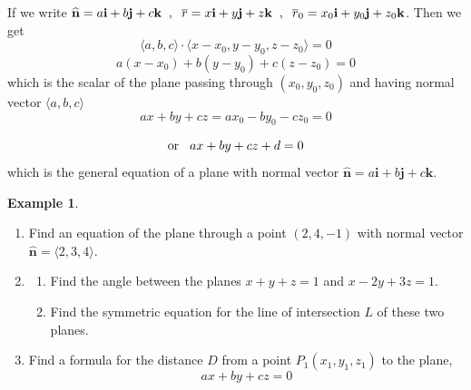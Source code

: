 \documentclass[11pt,a4paper]{article}
\theoremstyle{definition}
\newtheorem{exa}[thm]{Example}
\begin{document}
If we write $\widehat{\textbf{n}} = a\textbf{i} + b \textbf{j} + c\textbf{k}\hspace{0.2cm}, \hspace{0.2cm} \overline{r} = x\textbf{i} + y \textbf{j} + z\textbf{k} \hspace{0.2cm} , \hspace{0.2cm}\overline{r}_0  = x_0\textbf{i} + y_0 \textbf{j} + z_0\textbf{k}$. Then we get $$\langle a , b, c \rangle \cdot \langle x - x_0 , y - y_0 , z - z_0\rangle = 0$$ $$a(x - x_0) + b(y - y_0) + c(z - z_0)  = 0$$
which is the scalar of the plane passing through $(x_0,y_0,z_0)$ and having normal vector $\langle a, b, c\rangle$ $$ax + by + cz = ax_0 - by_0 -cz_0=0$$

$$\text{or}\hspace{0.3cm} ax + by + cz + d = 0$$
which is the general equation of  a plane with  normal vector \hspace{0.2cm}$\widehat{\textbf{n}} = a\textbf{i} + b\textbf{j} + c\textbf{k}$.


\begin{exa}
\begin{enumerate}
\item Find an equation of the plane through a point $(2,4,-1)$ with normal vector $\hat{\textbf{n}} = \langle 2,3,4\rangle$.
\item
\begin{enumerate}
       \item Find the angle between the planes $x + y + z = 1$ and $ x - 2y + 3z = 1$.
       \item Find the symmetric equation for the line of intersection $L$ of these two planes.
\end{enumerate}

\pagebreak
\item Find a formula for the distance $D$ from a point $P_1(x_1,y_1,z_1)$ to the plane, $$ax + by + cz = 0$$
\end{enumerate}
\end{exa}
\end{document}
